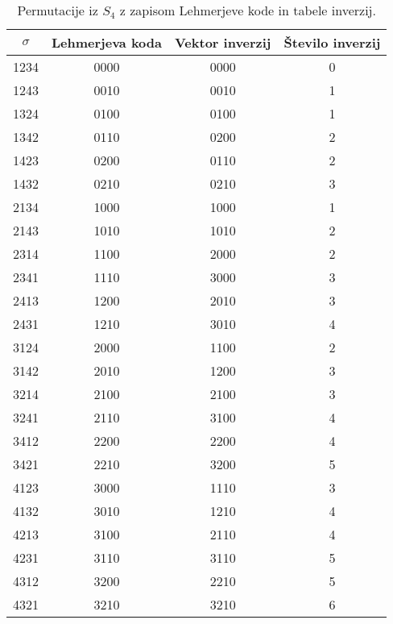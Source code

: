 \documentclass[a4paper, 12pt]{book}
\begin{document}
\begin{table}[h]
    \begin{center}
        \begin{tabular}{ |c|c|c|c| } 
        \hline
            $\sigma$ & Lehmerjeva koda & Vektor inverzij & Število inverzij \\ 
        \hline
            1234 & 0000 & 0000 & 0 \\ 
        \hline
            1243 & 0010 & 0010 & 1 \\ 
        \hline
            1324 & 0100 & 0100 & 1 \\ 
        \hline
            1342 & 0110 & 0200 & 2 \\ 
        \hline
            1423 & 0200 & 0110 & 2 \\ 
        \hline
            1432 & 0210 & 0210 & 3 \\ 
        \hline
            2134 & 1000 & 1000 & 1 \\ 
        \hline
            2143 & 1010 & 1010 & 2 \\ 
        \hline
            2314 & 1100 & 2000 & 2 \\ 
        \hline
            2341 & 1110 & 3000 & 3 \\ 
        \hline
            2413 & 1200 & 2010 & 3 \\ 
        \hline
            2431 & 1210 & 3010 & 4 \\ 
        \hline
            3124 & 2000 & 1100 & 2 \\ 
        \hline
            3142 & 2010 & 1200 & 3 \\ 
        \hline
            3214 & 2100 & 2100 & 3 \\ 
        \hline
            3241 & 2110 & 3100 & 4 \\ 
        \hline
            3412 & 2200 & 2200 & 4 \\ 
        \hline
            3421 & 2210 & 3200 & 5 \\ 
        \hline
            4123 & 3000 & 1110 & 3 \\ 
        \hline
            4132 & 3010 & 1210 & 4 \\ 
        \hline
            4213 & 3100 & 2110 & 4 \\ 
        \hline
            4231 & 3110 & 3110 & 5 \\
        \hline
            4312 & 3200 & 2210 & 5 \\ 
        \hline
            4321 & 3210 & 3210 & 6 \\ 
        \hline
        \end{tabular}
    \end{center}
    \caption{ Permutacije iz $S_4$ z zapisom Lehmerjeve kode in tabele inverzij. }
    \label{tbl:permutacije4vektorji}
\end{table}
\end{document}
